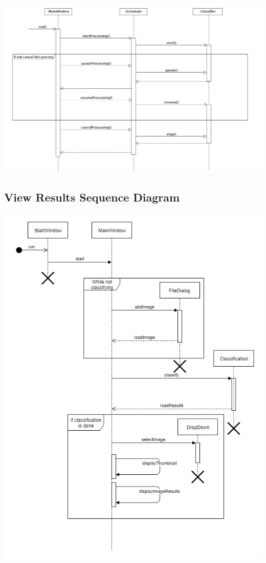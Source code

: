 \documentclass[parskip=full]{scrartcl}
\begin{document}
\begin{center}
\includegraphics[width=1.0\textwidth]{Classification.jpg}
\end{center}

\pagebreak

\subsection {View Results Sequence Diagram}

\begin{center}
\includegraphics[width=1.0\textwidth]{ViewResults.jpg}
\end{center}
\end{document}
